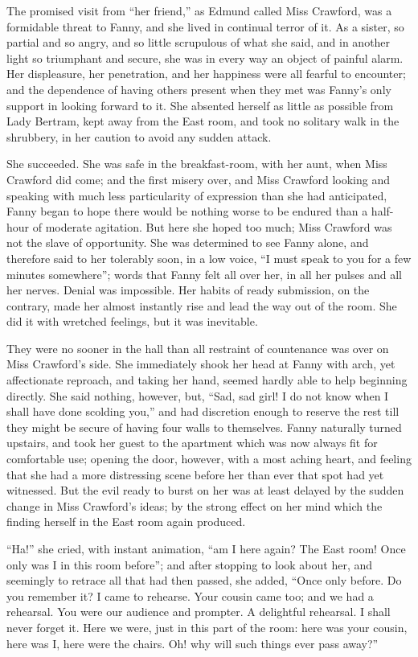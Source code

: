 \documentclass{article}
\begin{document}
The promised visit from ``her friend,'' as Edmund called
Miss Crawford, was a formidable threat to Fanny,
and she lived in continual terror of it.  As a sister,
so partial and so angry, and so little scrupulous of what
she said, and in another light so triumphant and secure,
she was in every way an object of painful alarm.
Her displeasure, her penetration, and her happiness were
all fearful to encounter; and the dependence of having
others present when they met was Fanny's only support
in looking forward to it.  She absented herself as little
as possible from Lady Bertram, kept away from the East room,
and took no solitary walk in the shrubbery, in her caution
to avoid any sudden attack.

She succeeded.  She was safe in the breakfast-room, with her aunt,
when Miss Crawford did come; and the first misery over,
and Miss Crawford looking and speaking with much less
particularity of expression than she had anticipated,
Fanny began to hope there would be nothing worse
to be endured than a half-hour of moderate agitation.
But here she hoped too much; Miss Crawford was not the slave
of opportunity.  She was determined to see Fanny alone,
and therefore said to her tolerably soon, in a low voice,
``I must speak to you for a few minutes somewhere'';
words that Fanny felt all over her, in all her pulses
and all her nerves.  Denial was impossible.  Her habits
of ready submission, on the contrary, made her almost
instantly rise and lead the way out of the room.
She did it with wretched feelings, but it was inevitable.

They were no sooner in the hall than all restraint
of countenance was over on Miss Crawford's side.
She immediately shook her head at Fanny with arch,
yet affectionate reproach, and taking her hand,
seemed hardly able to help beginning directly.
She said nothing, however, but, ``Sad, sad girl!
I do not know when I shall have done scolding you,''
and had discretion enough to reserve the rest till they
might be secure of having four walls to themselves.
Fanny naturally turned upstairs, and took her guest to the
apartment which was now always fit for comfortable use;
opening the door, however, with a most aching heart,
and feeling that she had a more distressing scene before
her than ever that spot had yet witnessed.  But the evil
ready to burst on her was at least delayed by the sudden
change in Miss Crawford's ideas; by the strong effect
on her mind which the finding herself in the East room
again produced.

``Ha!'' she cried, with instant animation, ``am I here again?
The East room!  Once only was I in this room before'';
and after stopping to look about her, and seemingly
to retrace all that had then passed, she added, ``Once
only before.  Do you remember it?  I came to rehearse.
Your cousin came too; and we had a rehearsal.  You were
our audience and prompter.  A delightful rehearsal.
I shall never forget it.  Here we were, just in this
part of the room:  here was your cousin, here was I,
here were the chairs.  Oh! why will such things ever
pass away?''
\end{document}
